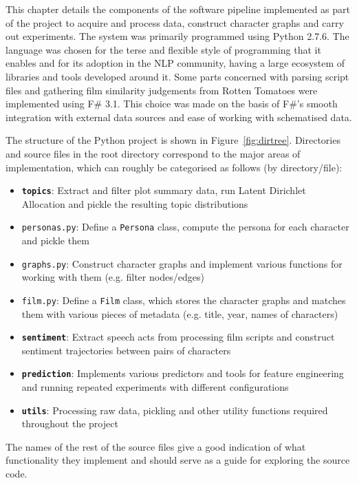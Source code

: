 \documentclass[bsc,frontabs,singlespacing,parskip, twoside]{infthesis}
\begin{document}
This chapter details the components of the software pipeline implemented as part of the project to acquire and process data, construct character graphs and carry out experiments. The system was primarily programmed using Python 2.7.6. The language was chosen for the terse and flexible style of programming that it enables and for its adoption in the NLP community, having a large ecosystem of libraries and tools developed around it. Some parts concerned with parsing script files and gathering film similarity judgements from Rotten Tomatoes were implemented using F\# 3.1. This choice was made on the basis of F\#'s smooth integration with external data sources and ease of working with schematised data.

The structure of the Python project is shown in Figure~\ref{fig:dirtree}. Directories and source files in the root directory correspond to the major areas of implementation, which can roughly be categorised as follows (by directory/file):
\begin{itemize}
	\item \texttt{\textbf{topics}}:  Extract and filter plot summary data, run Latent Dirichlet Allocation and pickle the resulting topic distributions
	\item \texttt{personas.py}: Define a \texttt{Persona} class, compute the persona for each character and pickle them
	\item \texttt{graphs.py}: Construct character graphs and implement various functions for working with them (e.g. filter nodes/edges)
	\item \texttt{film.py}: Define a \texttt{Film} class, which stores the character graphs and matches them with various pieces of metadata (e.g. title, year, names of characters)
	\item \texttt{\textbf{sentiment}}: Extract speech acts from processing film scripts and construct sentiment trajectories between pairs of characters
	\item \texttt{\textbf{prediction}}: Implements various predictors and tools for feature engineering and running repeated experiments with different configurations
	\item \texttt{\textbf{utils}}: Processing raw data, pickling and other utility functions required throughout the project
\end{itemize}

The names of the rest of the source files give a good indication of what functionality they implement and should serve as a guide for exploring the source code.
\end{document}
